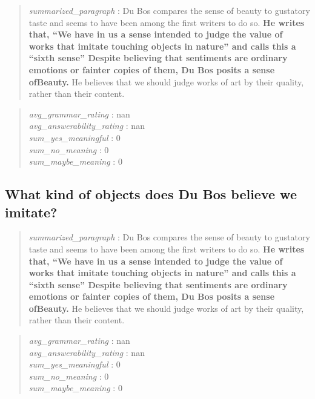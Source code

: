 \begin{quote}
\emph{summarized\_paragraph} : Du Bos compares the sense of beauty to
gustatory taste and seems to have been among the first writers to do so.
\textbf{He writes that, ``We have in us a sense intended to judge the
value of works that imitate touching objects in nature'' and calls this
a ``sixth sense'' Despite believing that sentiments are ordinary
emotions or fainter copies of them, Du Bos posits a sense ofBeauty.} He
believes that we should judge works of art by their quality, rather than
their content.
\end{quote}

\begin{quote}
\emph{avg\_grammar\_rating} : nan\\
\emph{avg\_answerability\_rating} : nan\\
\emph{sum\_yes\_meaningful} : 0\\
\emph{sum\_no\_meaning} : 0\\
\emph{sum\_maybe\_meaning} : 0
\end{quote}

\hypertarget{what-kind-of-objects-does-du-bos-believe-we-imitate}{%
\subsection{What kind of objects does Du Bos believe we
imitate?}\label{what-kind-of-objects-does-du-bos-believe-we-imitate}}

\begin{quote}
\emph{summarized\_paragraph} : Du Bos compares the sense of beauty to
gustatory taste and seems to have been among the first writers to do so.
\textbf{He writes that, ``We have in us a sense intended to judge the
value of works that imitate touching objects in nature'' and calls this
a ``sixth sense'' Despite believing that sentiments are ordinary
emotions or fainter copies of them, Du Bos posits a sense ofBeauty.} He
believes that we should judge works of art by their quality, rather than
their content.
\end{quote}

\begin{quote}
\emph{avg\_grammar\_rating} : nan\\
\emph{avg\_answerability\_rating} : nan\\
\emph{sum\_yes\_meaningful} : 0\\
\emph{sum\_no\_meaning} : 0\\
\emph{sum\_maybe\_meaning} : 0
\end{quote}

